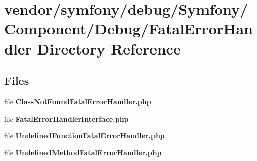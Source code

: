 \section{vendor/symfony/debug/\+Symfony/\+Component/\+Debug/\+Fatal\+Error\+Handler Directory Reference}
\label{dir_c1457b240f5429ad5901e6844e029ba3}
\subsection*{Files}
\begin{DoxyCompactItemize}
\item 
file {\bf Class\+Not\+Found\+Fatal\+Error\+Handler.\+php}
\item 
file {\bf Fatal\+Error\+Handler\+Interface.\+php}
\item 
file {\bf Undefined\+Function\+Fatal\+Error\+Handler.\+php}
\item 
file {\bf Undefined\+Method\+Fatal\+Error\+Handler.\+php}
\end{DoxyCompactItemize}
